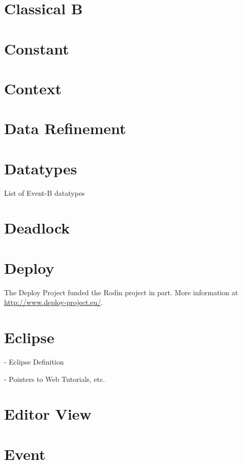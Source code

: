 \section{Classical B}
\label{classical_b}

\section{Constant}
\label{constant}

\section{Context}
\label{context}

\section{Data Refinement}
\label{data_refinement}

\section{Datatypes}
\label{datatypes}

List of Event-B datatypes

\section{Deadlock}
\label{deadlock}

\section{Deploy}
\label{deploy}

The Deploy Project funded the Rodin project in part.  More information at \url{http://www.deploy-project.eu/}.

\section{Eclipse}
\label{eclipse}

- Eclipse Definition

- Pointers to Web Tutorials, etc.

\section{Editor View}
\label{editor_view}


\section{Event}
\label{event}

